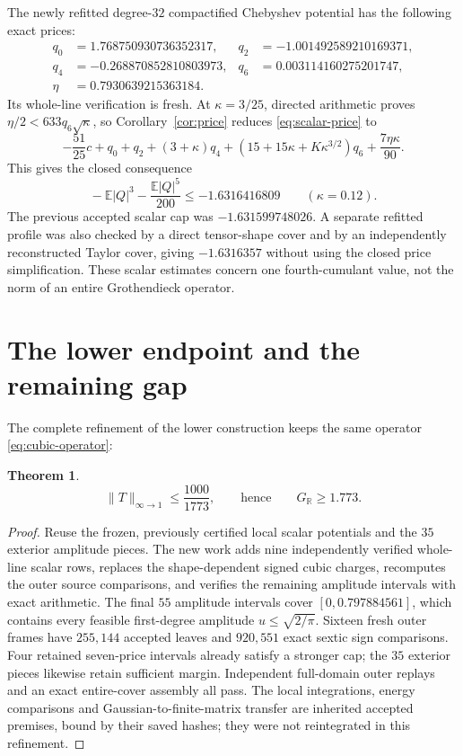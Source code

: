 \documentclass[11pt]{article}
\newtheorem{theorem}{Theorem}
\newcommand{\E}{\mathbb E}
\newcommand{\R}{\mathbb R}
\newcommand{\GR}{G_{\R}}
\newcommand{\norm}[1]{\lVert #1\rVert}
\begin{document}
The newly refitted degree-$32$ compactified Chebyshev potential has the following exact prices:
\begin{align*}
 q_0&=1.768750930736352317,&q_2&=-1.001492589210169371,\\
 q_4&=-0.268870852810803973,&q_6&=0.003114160275201747,\\
 \eta&=0.7930639215363184.
\end{align*}
Its whole-line verification is fresh. At $\kappa=3/25$, directed arithmetic proves $\eta/2<633q_6\sqrt\kappa$, so Corollary~\ref{cor:price} reduces \eqref{eq:scalar-price} to
\begin{equation}\label{eq:scalar-closed}
 -\frac{51}{25}c+q_0+q_2+(3+\kappa)q_4
 +(15+15\kappa+K\kappa^{3/2})q_6+\frac{7\eta\kappa}{90}.
\end{equation}
This gives the closed consequence
\begin{equation}\label{eq:scalar-new}
 \boxed{\quad-\E|Q|^3-\frac{\E|Q|^5}{200}
 \le-1.6316416809\qquad(\kappa=0.12).\quad}
\end{equation}
The previous accepted scalar cap was $-1.631599748026$. A separate refitted profile was also checked by a direct tensor-shape cover and by an independently reconstructed Taylor cover, giving $-1.6316357$ without using the closed price simplification. These scalar estimates concern one fourth-cumulant value, not the norm of an entire Grothendieck operator.

\section{The lower endpoint and the remaining gap}
The complete refinement of the lower construction keeps the same operator \eqref{eq:cubic-operator}:
\begin{theorem}\label{thm:lower}
\begin{equation}\label{eq:new-lower}
 \norm T_{\infty\to1}\le\frac{1000}{1773},
 \qquad\text{hence}\qquad \GR\ge1.773.
\end{equation}
\end{theorem}
\begin{proof}
Reuse the frozen, previously certified local scalar potentials and the $35$ exterior amplitude pieces. The new work adds nine independently verified whole-line scalar rows, replaces the shape-dependent signed cubic charges, recomputes the outer source comparisons, and verifies the remaining amplitude intervals with exact arithmetic. The final $55$ amplitude intervals cover $[0,0.797884561]$, which contains every feasible first-degree amplitude $u\le\sqrt{2/\pi}$. Sixteen fresh outer frames have $255{,}144$ accepted leaves and $920{,}551$ exact sextic sign comparisons. Four retained seven-price intervals already satisfy a stronger cap; the $35$ exterior pieces likewise retain sufficient margin. Independent full-domain outer replays and an exact entire-cover assembly all pass. The local integrations, energy comparisons and Gaussian-to-finite-matrix transfer are inherited accepted premises, bound by their saved hashes; they were not reintegrated in this refinement.\end{proof}
\end{document}
